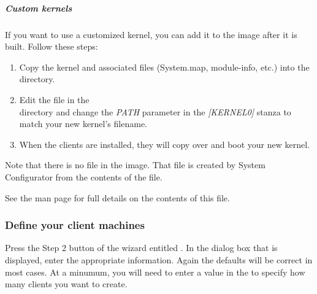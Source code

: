\subparagraph{Custom kernels}
If you want to use a customized kernel, you can add it to the image
after it is built. Follow these steps:
\begin{enumerate}
\item Copy the kernel and associated files (System.map, module-info, etc.) into the \\
 directory.
\item Edit the  file in the \\
directory and change the \emph{PATH} parameter in the \emph{[KERNEL0]} stanza to 
match your new kernel's filename.
\item When the clients are installed, they will copy over and boot your new
kernel. 
\end{enumerate}
Note that there is no  file in the image. That file is created
by System Configurator from the contents of the  file.

See the  man page for full details on the
contents of this file.

\subsubsection{Define your client machines} 
\label{det:defclients}

Press the Step 2 button of the wizard entitled . In the dialog box that is displayed, enter the
appropriate information. Again the defaults will be correct in most
cases. At a minumum, you will need to enter a value in the 
to specify how many clients you want to create.

